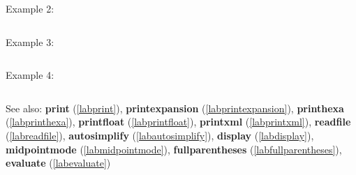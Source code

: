 \begin{center}\begin{minipage}{15cm}\begin{Verbatim}[frame=single]
\end{Verbatim}
\end{minipage}\end{center}
\noindent Example 2: 
\begin{center}\begin{minipage}{15cm}\begin{Verbatim}[frame=single]
\end{Verbatim}
\end{minipage}\end{center}
\noindent Example 3: 
\begin{center}\begin{minipage}{15cm}\begin{Verbatim}[frame=single]
\end{Verbatim}
\end{minipage}\end{center}
\noindent Example 4: 
\begin{center}\begin{minipage}{15cm}\begin{Verbatim}[frame=single]
\end{Verbatim}
\end{minipage}\end{center}
See also: \textbf{print} (\ref{labprint}), \textbf{printexpansion} (\ref{labprintexpansion}), \textbf{printhexa} (\ref{labprinthexa}), \textbf{printfloat} (\ref{labprintfloat}), \textbf{printxml} (\ref{labprintxml}), \textbf{readfile} (\ref{labreadfile}), \textbf{autosimplify} (\ref{labautosimplify}), \textbf{display} (\ref{labdisplay}), \textbf{midpointmode} (\ref{labmidpointmode}), \textbf{fullparentheses} (\ref{labfullparentheses}), \textbf{evaluate} (\ref{labevaluate})
